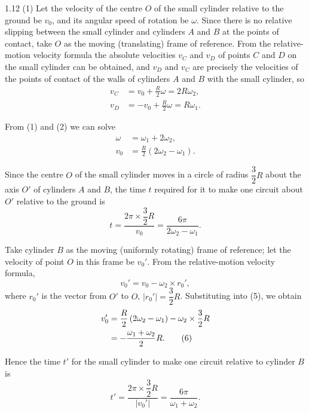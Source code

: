\begin{solution}{1.12}
(1) Let the velocity of the centre $O$ of the small cylinder relative to the ground be $v_0$, and
its angular speed of rotation be $\omega$. Since there is no relative slipping between the small
cylinder and cylinders $A$ and $B$ at the points of contact, take $O$ as the moving (translating)
frame of reference. From the relative-motion velocity formula the absolute velocities $v_C$ and
$v_D$ of points $C$ and $D$ on the small cylinder can be obtained, and $v_D$ and $v_C$ are
precisely the velocities of the points of contact of the walls of cylinders $A$ and $B$ with the
small cylinder, so
\begin{align}
v_C &= v_0+\frac{R}{2}\omega = 2R\omega_2, \tag{1}\\
v_D &= -v_0+\frac{R}{2}\omega = R\omega_1. \tag{2}
\end{align}

From (1) and (2) we can solve
\begin{align}
\omega &= \omega_1+2\omega_2, \tag{3}\\
v_0 &= \frac{R}{2}\left(2\omega_2-\omega_1\right). \tag{4}
\end{align}

Since the centre $O$ of the small cylinder moves in a circle of radius $\dfrac{3}{2}R$ about the
axis $O'$ of cylinders $A$ and $B$, the time $t$ required for it to make one circuit about $O'$
relative to the ground is
\begin{equation*}
t = \frac{2\pi\times\dfrac{3}{2}R}{v_0} = \frac{6\pi}{2\omega_2-\omega_1}.
\end{equation*}

Take cylinder $B$ as the moving (uniformly rotating) frame of reference; let the velocity of
point $O$ in this frame be $v_0'$. From the relative-motion velocity formula,
\begin{equation}
v_0' = v_0-\omega_2\times r_0', \tag{5}
\end{equation}
where $r_0'$ is the vector from $O'$ to $O$, $|r_0'|=\dfrac{3}{2}R$. Substituting into (5), we
obtain
\begin{align}
v_0' &= \frac{R}{2}\left(2\omega_2-\omega_1\right)-\omega_2\times\frac{3}{2}R\notag\\
&= -\frac{\omega_1+\omega_2}{2}R. \tag{6}
\end{align}

Hence the time $t'$ for the small cylinder to make one circuit relative to cylinder $B$ is
\begin{equation*}
t' = \frac{2\pi\times\dfrac{3}{2}R}{|v_0'|} = \frac{6\pi}{\omega_1+\omega_2}.
\end{equation*}


\end{solution}
